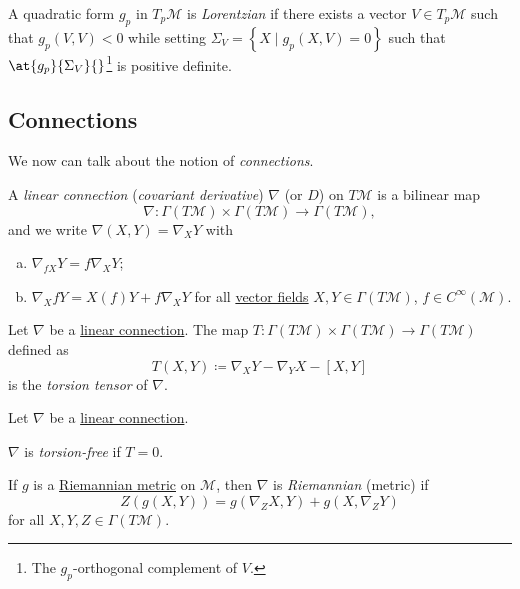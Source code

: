 \begin{definition}[Lorentzian]\label{def:Lorentzian}
	A quadratic form \(g_p\) in \(T_{p} \mathcal{M} \) is \emph{Lorentzian} if there exists a vector \(V\in T_p \mathcal{M} \) such that \(g_p(V, V) < 0\) while setting \(\Sigma _V = \left\{ X \mid g_p(X, V) = 0 \right\}\) such that \(\at{g_p}{\Sigma _V}{} \)\footnote{The \(g_p\)-orthogonal complement of \(V\).} is positive definite.
\end{definition}

\subsection{Connections}
We now can talk about the notion of \emph{connections}.

\begin{definition}\label{def:linear-connection}
	A \emph{linear connection} (\emph{covariant derivative}) \(\nabla \) (or \(D\)) on \(T\mathcal{M} \) is a bilinear map
	\[
		\nabla \colon \Gamma (T \mathcal{M} ) \times \Gamma (T \mathcal{M} ) \to \Gamma (T \mathcal{M} ),
	\]
	and we write \(\nabla (X, Y) = \nabla _X Y\) with
	\begin{enumerate}[(a)]
		\item \(\nabla _{fX}Y = f \nabla _X Y\);
		\item \(\nabla _X fY = X(f)Y + f \nabla _X Y\) for all \hyperref[def:vector-field]{vector fields} \(X, Y\in \Gamma (T \mathcal{M} )\), \(f\in C^{\infty} (\mathcal{M} )\).
	\end{enumerate}
\end{definition}

\begin{definition}\label{def:torsion-tensor}
	Let \(\nabla \) be a \hyperref[def:linear-connection]{linear connection}. The map \(T\colon \Gamma (T \mathcal{M} )\times \Gamma (T \mathcal{M} )\to \Gamma (T \mathcal{M} )\) defined as
	\[
		T(X, Y) \coloneqq \nabla _X Y - \nabla _Y X - [X, Y]
	\]
	is the \emph{torsion tensor} of \(\nabla \).
\end{definition}

\begin{definition*}
	Let \(\nabla \) be a \hyperref[def:linear-connection]{linear connection}.

	\begin{definition}\label{def:torsion-free}
		\(\nabla \) is \emph{torsion-free} if \(T = 0\).
	\end{definition}

	\begin{definition}[Riemannian]\label{def:Riemannian}
		If \(g\) is a \hyperref[def:Riemannian-metric]{Riemannian metric} on \(\mathcal{M} \), then \(\nabla \) is \emph{Riemannian} (metric) if
		\[
			Z(g(X, Y)) = g(\nabla _{Z} X, Y) + g(X, \nabla _{Z} Y)
		\]
		for all \(X, Y, Z\in \Gamma (T\mathcal{M} )\).
	\end{definition}
\end{definition*}

